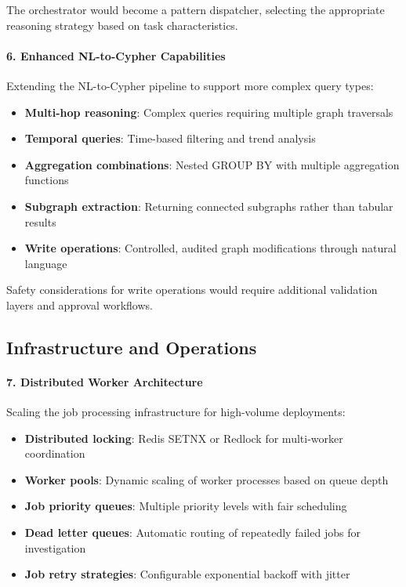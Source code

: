 The orchestrator would become a pattern dispatcher, selecting the appropriate reasoning strategy based on task characteristics.

\paragraph{6. Enhanced NL-to-Cypher Capabilities}

Extending the NL-to-Cypher pipeline to support more complex query types:

\begin{itemize}
    \item \textbf{Multi-hop reasoning}: Complex queries requiring multiple graph traversals
    \item \textbf{Temporal queries}: Time-based filtering and trend analysis
    \item \textbf{Aggregation combinations}: Nested GROUP BY with multiple aggregation functions
    \item \textbf{Subgraph extraction}: Returning connected subgraphs rather than tabular results
    \item \textbf{Write operations}: Controlled, audited graph modifications through natural language
\end{itemize}

Safety considerations for write operations would require additional validation layers and approval workflows.

\subsection{Infrastructure and Operations}

\paragraph{7. Distributed Worker Architecture}

Scaling the job processing infrastructure for high-volume deployments:

\begin{itemize}
    \item \textbf{Distributed locking}: Redis SETNX or Redlock for multi-worker coordination
    \item \textbf{Worker pools}: Dynamic scaling of worker processes based on queue depth
    \item \textbf{Job priority queues}: Multiple priority levels with fair scheduling
    \item \textbf{Dead letter queues}: Automatic routing of repeatedly failed jobs for investigation
    \item \textbf{Job retry strategies}: Configurable exponential backoff with jitter
\end{itemize}

